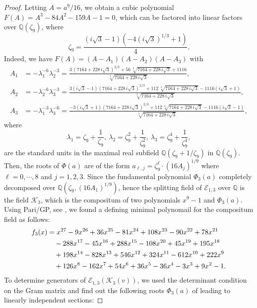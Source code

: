 \documentclass[11pt]{amsart}
\newcommand{\Q}{{\mathbb Q}}
\newcommand{\Ee}{{\mathcal E}}
\newcommand{\KK}{{\mathcal K}}
\numberwithin{equation}{section}
\numberwithin{table}{section}
\newcommand\<{\langle}
\begin{document}
\begin{proof}
	Letting $A=a^9/16$, we obtain a cubic polynomial $F(A)=A^3- 84 A^2- 159 A-1=0$, which can be factored into linear factors over $\Q(\zeta_9)$, where
		$$\zeta_{9}=\frac{( i \sqrt{3}-1 )(-4( i \sqrt{3})^{1/3}+1)}{4}. $$
%	
	Indeed, we have  $F(A)=(A-A_1)(A-A_2)(A-A_3)$ with
\begin{align*}
	A_1& =- \lambda_1^{-6} \lambda_2^{-3}={\frac {3\, \left( 7164+228\,i\sqrt {3} \right) ^{2/3}+56\,\sqrt [3]{
				7164+228\,i\sqrt {3}}+1116}{\sqrt [3]{7164+228\,i\sqrt {3}}}},\\
	A_2& =- \lambda_2^{-6} \lambda_3^{-3}= {\frac {3 (i \sqrt {3}-1) \left( 7164+228\,i\sqrt {3} \right) ^{2/3}
			+112\,	\sqrt [3]{7164+228\,i\sqrt {3}}-1116(i\sqrt {3} +1)}{\sqrt [3]{7164+228\,i\sqrt {3}}}},\\
	A_3&= - \lambda_1^{-3} \lambda_3^{-6}={\frac {-3 (i \sqrt {3}+1) \left( 7164+228\,i\sqrt {3} \right) ^{2/3}
			+112\,	\sqrt [3]{7164+228\,i\sqrt {3}}-1116(i\sqrt {3} -1)}{\sqrt [3]{7164+228\,i\sqrt {3}}}},
\end{align*}	
	where 
	$$\lambda_1=\zeta_9+\frac{1}{\zeta_9}, \  \lambda_2=\zeta_9^2+\frac{1}{\zeta_9^2}, \ \lambda_3=\zeta_9^4+\frac{1}{\zeta_9^4},$$ 
	are the standard units in the maximal real subfield $\Q(\zeta_9 + 1/\zeta_9)$ in $\Q(\zeta_9)$.
	Then, the roots of  $\Phi(a)$ are of the form $a_{\ell,j}=\zeta_9^\ell \cdot (16 A_j)^{1/9}$ where $\ell = 0, \cdots, 8$ and $j=1, 2, 3$.
	Since the fundamental polynomial $\Phi_3(a)$ completely decomposed over $\Q(\zeta_9, (16 A_1)^{1/9})$, hence the splitting field of  $\Ee_{1,3}$ over $\Q$ is the field $\KK_3$, which is the compositum of two polynomials $x^9-1$ and  $\Phi_3(a)$. Using Pari/GP, see \cite[GP360]{Shioda360-Codes}, we found  a defining minimal polynomail for the compositum field as follows:
	\begin{align}
	f_3(x)	& = x^{27} - 9x^{26} + 36x^{25} - 81x^{24} + 108x^{23} - 90x^{22} + 78x^{21} \notag \\
		& \quad  - 288x^{17} - 45x^{16} + 288x^{15}  - 108x^{20} + 45x^{19} + 195x^{18} \notag \\
		& \quad + 198x^{14} - 828x^{13} + 546x^{12} + 324x^{11} - 612x^{10} + 222x^{9} \notag  \\
		& \quad + 126x^{8} - 162x^{7} + 54x^{6} + 36x^{5} - 36x^{4} - 3x^{3} + 9x^{2} - 1. \label{f3}
	\end{align}
	To determine  generators of $\Ee_{1,3}(\KK_3(v))$, we used the determinant condition on the Gram matrix and find out  the following roots $\Phi_3(a)$ of leading  to linearly independent  sections:

\end{proof}
\end{document}
